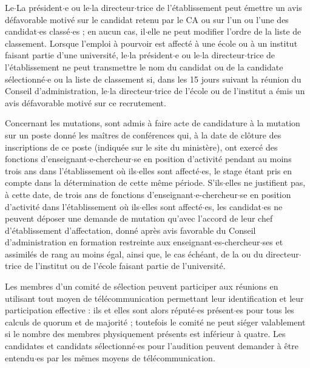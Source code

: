 Le$\cdot$La pr\'esident$\cdot$e ou le$\cdot$la directeur$\cdot$trice de l'\'etablissement peut \'emettre un avis d\'efavorable motiv\'e sur le candidat retenu par
le CA ou sur l'un ou l'une des candidat$\cdot$es class\'e$\cdot$es ; en aucun cas, il$\cdot$elle ne peut modifier l'ordre de la liste de classement.
Lorsque l'emploi \`a pourvoir est affect\'e \`a une \'ecole ou \`a un institut faisant partie d'une universit\'e, le$\cdot$la pr\'esident$\cdot$e ou
le$\cdot$la directeur$\cdot$trice de l'\'etablissement ne peut transmettre le nom du candidat ou de la candidate s\'electionn\'e$\cdot$e ou la liste de classement si,
dans les 15 jours suivant la r\'eunion du Conseil d'administration, le$\cdot$la directeur$\cdot$trice de l'\'ecole ou de l'institut a \'emis un
avis d\'efavorable motiv\'e sur ce recrutement.

Concernant les mutations, sont admis \`a faire acte de candidature \`a la mutation sur un poste donn\'e les ma\^itres de conf\'erences qui, \`a la date de cl\^oture des inscriptions de ce poste (indiqu\'ee sur le site du minist\`ere), ont exerc\'e des fonctions d'enseignant$\cdot$e-chercheur$\cdot$se en position d'activit\'e pendant au moins trois ans dans l'\'etablissement o\`u ils$\cdot$elles sont affect\'e$\cdot$es, le stage \'etant pris en compte dans la d\'etermination de cette m\^eme p\'eriode. S'ils$\cdot$elles ne justifient pas, \`a cette date, de trois ans de fonctions d'enseignant$\cdot$e-chercheur$\cdot$se en position d'activit\'e dans l'\'etablissement o\`u ils$\cdot$elles sont affect\'e$\cdot$es, les candidat$\cdot$es ne peuvent d\'eposer une demande de mutation qu'avec l'accord de leur chef d'\'etablissement d'affectation, donn\'e apr\`es avis favorable du Conseil d'administration en formation restreinte aux enseignant$\cdot$es-chercheur$\cdot$ses et assimil\'es de rang au moins \'egal, ainsi que, le cas \'ech\'eant, de la ou du directeur$\cdot$trice de l'institut ou de l'\'ecole faisant partie de l'universit\'e.

Les membres d'un comit\'e de s\'election peuvent participer aux r\'eunions en utilisant tout moyen de 
t\'el\'ecom\-munication permettant leur identification et leur participation effective : ils et elles sont alors r\'eput\'e$\cdot$es pr\'esent$\cdot$es pour
tous les calculs de quorum et de majorit\'e ; toutefois le comit\'e ne peut si\'eger valablement si le nombre des
membres physiquement pr\'esents est inf\'erieur \`a quatre.
Les candidates et candidats s\'electionn\'e$\cdot$es pour l'audition peuvent demander \`a \^etre entendu$\cdot$es par les m\^emes moyens de
t\'el\'ecommunication.

